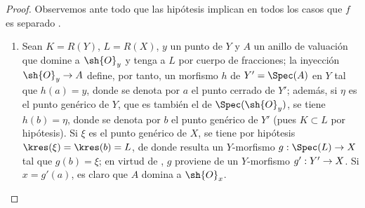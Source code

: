\documentclass[oneside,10pt]{amsart}
\makeatletter
\newcommand{\ega@arrow}[2]{\mathchoice{#1}{#2}{#2}{#2}}
\renewcommand{\to}{\ega@arrow{\longrightarrow}{\rightarrow}}
\makeatother
\begin{document}
\begin{proof}
Observemos ante todo que las hipótesis implican en todos los casos que $f$ es separado .
\begin{enumerate}
  \item[\rm{(i)}] Sean $K=R(Y)$, $L=R(X)$, $y$ un punto de $Y$ y $A$ un anillo de valuación que domine a $\sh{O}_y$ y tenga a $L$ por cuerpo de fracciones;
  la inyección $\sh{O}_y\to A$ define, por tanto, un morfismo $h$ de $Y'=\Spec(A)$ en $Y$  tal que $h(a)=y$, donde se denota por $a$ el punto cerrado de $Y'$;
  además, si $\eta$ es el punto genérico de $Y$, que es también el de $\Spec(\sh{O}_y)$, se tiene $h(b)=\eta$, donde se denota por $b$ el punto genérico de $Y'$ (pues $K\subset L$ por hipótesis).
  Si $\xi$ es el punto genérico de $X$, se tiene por hipótesis $\kres(\xi)=\kres(b)=L$, de donde resulta un $Y$-morfismo $g:\Spec(L)\to X$ tal que $g(b)=\xi$;
  en virtud de , $g$ proviene de un $Y$-morfismo $g':Y'\to X$.
  Si $x=g'(a)$, es claro que $A$ domina a $\sh{O}_x$.


\end{enumerate}
\end{proof}
\end{document}
